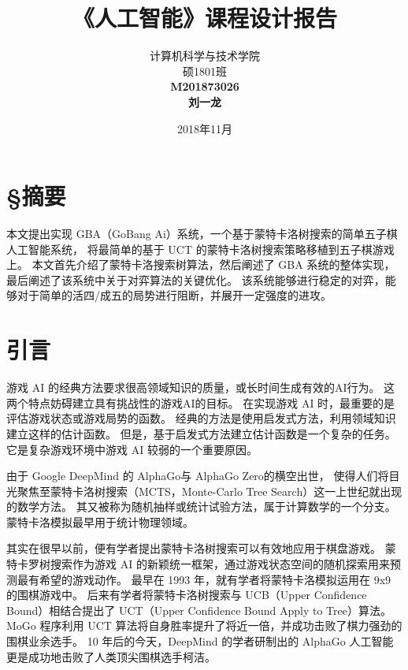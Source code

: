 \documentclass[UTF8,cs4size]{ctexart}
\title{{\LARGE《\textbf{人工智能}》课程设计报告}\\ \bigskip \bigskip \bigskip {\Large 选题名称：\textbf{GBA - 一个基于蒙特卡洛树搜索的简单五子棋人工智能系统}} \vspace{8cm}}
\author{计算机科学与技术学院\\ 硕1801班\\ \textbf{M201873026}\\ \textbf{刘一龙}}
\date{2018年11月}
\begin{document}
\maketitle
\newpage

\section*{\S 摘要}
本文提出实现 GBA（GoBang Ai）系统，一个基于蒙特卡洛树搜索的简单五子棋人工智能系统，
将最简单的基于 UCT 的蒙特卡洛树搜索策略移植到五子棋游戏上。
本文首先介绍了蒙特卡洛搜索树算法，然后阐述了 GBA 系统的整体实现，最后阐述了该系统中关于对弈算法的关键优化。
该系统能够进行稳定的对弈，能够对于简单的活四/成五的局势进行阻断，并展开一定强度的进攻。
\newpage


\null\thispagestyle{empty}
\newpage
\tableofcontents
\newpage
\null\thispagestyle{empty}
\newpage


\section{引言}
游戏 AI 的经典方法要求很高领域知识的质量，或长时间生成有效的AI行为。
这两个特点妨碍建立具有挑战性的游戏AI的目标。
在实现游戏 AI 时，最重要的是评估游戏状态或游戏局势的函数。
经典的方法是使用启发式方法，利用领域知识建立这样的估计函数。
但是，基于启发式方法建立估计函数是一个复杂的任务。
它是复杂游戏环境中游戏 AI 较弱的一个重要原因。

由于 Google DeepMind 的 AlphaGo\cite{DBLP:journals/nature/SilverHMGSDSAPL16}与 AlphaGo Zero\cite{silver2017mastering}的横空出世，
使得人们将目光聚焦至蒙特卡洛树搜索（MCTS，Monte-Carlo Tree Search）\cite{wiki:Monte_Carlo_tree_search}这一上世纪就出现的数学方法。
其又被称为随机抽样或统计试验方法，属于计算数学的一个分支。蒙特卡洛模拟\cite{binder1993monte}最早用于统计物理领域。

其实在很早以前，便有学者提出蒙特卡洛树搜索可以有效地应用于棋盘游戏\cite{DBLP:conf/aiide/ChaslotBSS08}。
蒙特卡罗树搜索作为游戏 AI 的新颖统一框架，通过游戏状态空间的随机探索用来预测最有希望的游戏动作。
最早在 1993 年\cite{brugmann1993monte}，就有学者将蒙特卡洛模拟运用在 9x9 的围棋游戏中。
后来有学者将蒙特卡洛树搜索与 UCB（Upper Confidence Bound）相结合提出了 UCT（Upper Confidence Bound Apply to Tree）算法\cite{DBLP:conf/ecml/KocsisS06}。
MoGo 程序\cite{DBLP:conf/cig/WangG07}\cite{DBLP:conf/icml/GellyS07}利用 UCT 算法将自身胜率提升了将近一倍，并成功击败了棋力强劲的围棋业余选手。
10 年后的今天，DeepMind 的学者研制出的 AlphaGo 人工智能更是成功地击败了人类顶尖围棋选手柯洁。
\end{document}

